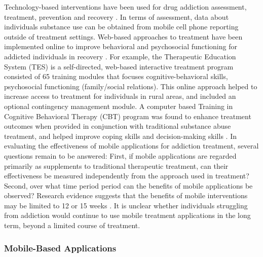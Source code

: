 \documentclass[sigconf]{acmart}
\begin{document}
Technology-based interventions have been used for drug addiction assessment, 
treatment, prevention and recovery \cite{marsch12}. In terms of assessment, data 
about individuals substance use can be obtained from mobile cell phone reporting 
outside of treatment settings. Web-based approaches to treatment have been 
implemented online to improve behavioral and psychosocial functioning for addicted 
individuals in recovery \cite{marschdallery2012}. For example, the Therapeutic 
Education System (TES) is a self-directed, web-based interactive treatment program 
consisted of 65 training modules that  focuses cognitive-behavioral skills, 
psychosocial functioning (family/social relations). This online approach helped 
to increase access to treatment for individuals in rural areas, and included an 
optional contingency management module. A computer based Training in Cognitive 
Behavioral Therapy (CBT) program was found to enhance treatment outcomes when 
provided in conjunction with traditional substance abuse treatment, and helped 
improve coping skills and decision-making skills \cite{carroll08}. In evaluating 
the effectiveness of mobile applications for addiction treatment, several  
questions remain to be answered: First, if mobile applications are regarded 
primarily as supplements to traditional therapeutic treatment, can their 
effectiveness be measured independently from the approach used in treatment? 
Second, over what time period period can the benefits of mobile applications be 
observed? Research evidence suggests that the benefits of mobile interventions 
may be limited to 12 or 15 weeks \cite{swedenson16}. It is unclear whether 
individuals struggling from addiction would continue to use mobile treatment 
applications in the long term, beyond a limited course of treatment.


\subsubsection{Mobile-Based Applications}
\end{document}
